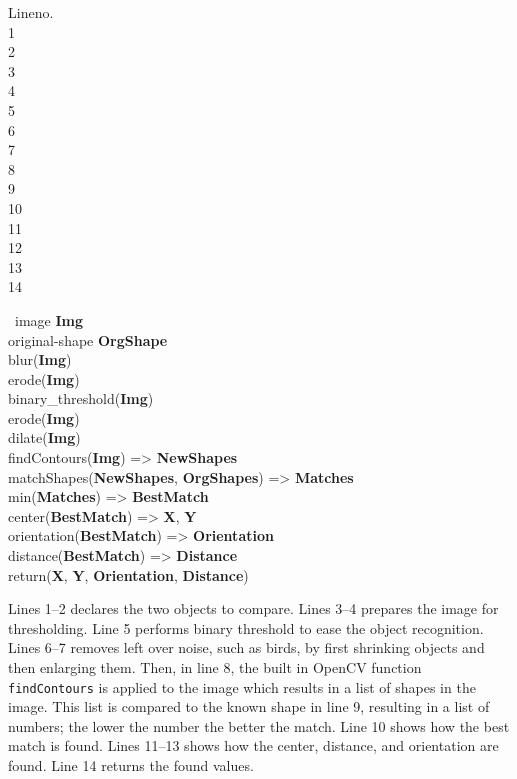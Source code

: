\begin{center}
	\begin{minipage}[t]{0.1\textwidth}
		\begin{flushright}
			Lineno.\\1\\2\\3\\4\\5\\6\\7\\8\\9\\10\\11\\12\\13\\14
		\end{flushright}
	\end{minipage}
	\begin{minipage}[t]{0.8\textwidth}
		~\-image \textbf{Img}\\
		original-shape \textbf{OrgShape}\\
		blur(\textbf{Img})\\
		erode(\textbf{Img})\\
		binary\_threshold(\textbf{Img})\\
		erode(\textbf{Img})\\
		dilate(\textbf{Img})\\
		findContours(\textbf{Img}) => \textbf{NewShapes}\\
		matchShapes(\textbf{NewShapes}, \textbf{OrgShapes}) => \textbf{Matches}\\
		min(\textbf{Matches}) => \textbf{BestMatch}\\
		center(\textbf{BestMatch}) => \textbf{X}, \textbf{Y}\\
		orientation(\textbf{BestMatch}) => \textbf{Orientation}\\
		distance(\textbf{BestMatch}) => \textbf{Distance}\\
		return(\textbf{X}, \textbf{Y}, \textbf{Orientation}, \textbf{Distance})
	\end{minipage}
\end{center}
Lines 1--2 declares the two objects to compare. Lines 3--4 prepares the image for thresholding. Line 5 performs binary threshold to ease the object recognition. Lines 6--7 removes left over noise, such as birds, by first shrinking objects and then enlarging them. Then, in line 8, the built in OpenCV function \verb|findContours| is applied to the image which results in a list of shapes in the image. This list is compared to the known shape in line 9, resulting in a list of numbers; the lower the number the better the match. Line 10 shows how the best match is found. Lines 11--13 shows how the center, distance, and orientation are found. Line 14 returns the found values.

